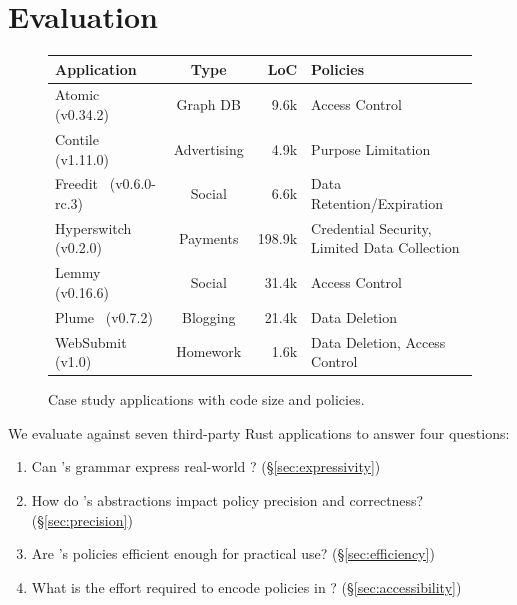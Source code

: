 \chapter{Evaluation}

\begin{figure}
    \centering
    \small
     \begin{tabular}{l|c|r|l}
       \bf Application        & \bf Type    & \bf LoC & \bf Policies   \\
      \hline
       Atomic~\cite{atomic} (v0.34.2)       & Graph DB    & 9.6k   & Access Control                                 \\
       Contile~\cite{contile} (v1.11.0)     & Advertising & 4.9k     & Purpose Limitation                           \\
       Freedit~\cite{freedit} (v0.6.0-rc.3) & Social      & 6.6k     & Data Retention/Expiration                     \\
       Hyperswitch~\cite{hyperswitch} (v0.2.0)   & Payments    & 198.9k     & \makecell[l]{Credential Security,\\Limited Data Collection}  \\
       Lemmy~\cite{lemmy} (v0.16.6)        & Social      & 31.4k   & Access Control                               \\
       Plume~\cite{plume} (v0.7.2)         & Blogging    & 21.4k   & Data Deletion                                \\
       WebSubmit~\cite{websubmit} (v1.0)       & Homework    & 1.6k    & Data Deletion, Access Control     \\
    \end{tabular}
    \caption{Case study applications with code size and policies.}
    \label{f:apps}
   \end{figure}

We evaluate \syslang{} against seven third-party Rust applications to answer four questions:
%
\begin{enumerate}[nosep]
    \item Can \syslang's grammar express real-world \policies? (\S\ref{sec:expressivity})
    \item How do \syslang's abstractions impact policy precision and correctness?(\S\ref{sec:precision})
    \item Are \syslang's policies efficient enough for practical use? (\S\ref{sec:efficiency})
    \item What is the effort required to encode policies in \syslang? (\S\ref{sec:accessibility})
\end{enumerate}
%

